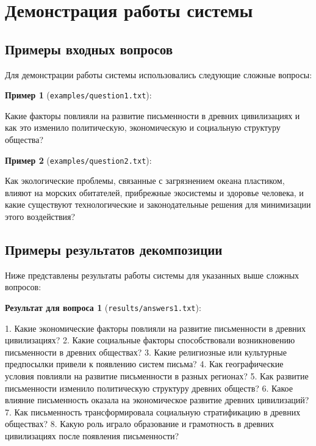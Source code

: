 \section{Демонстрация работы системы}

\subsection{Примеры входных вопросов}

Для демонстрации работы системы использовались следующие сложные вопросы:

\textbf{Пример 1} (\texttt{examples/question1.txt}):
\begin{spverbatim}
Какие факторы повлияли на развитие письменности в древних цивилизациях и как это изменило политическую, экономическую и социальную структуру общества?
\end{spverbatim}

\textbf{Пример 2} (\texttt{examples/question2.txt}):
\begin{spverbatim}
Как экологические проблемы, связанные с загрязнением океана пластиком, влияют на морских обитателей, прибрежные экосистемы и здоровье человека, и какие существуют технологические и законодательные решения для минимизации этого воздействия?
\end{spverbatim}

\subsection{Примеры результатов декомпозиции}

Ниже представлены результаты работы системы для указанных выше сложных вопросов:

\textbf{Результат для вопроса 1} (\texttt{results/answers1.txt}):
\begin{spverbatim}
1. Какие экономические факторы повлияли на развитие письменности в древних цивилизациях?
2. Какие социальные факторы способствовали возникновению письменности в древних обществах?
3. Какие религиозные или культурные предпосылки привели к появлению систем письма?
4. Как географические условия повлияли на развитие письменности в разных регионах?
5. Как развитие письменности изменило политическую структуру древних обществ?
6. Какое влияние письменность оказала на экономическое развитие древних цивилизаций?
7. Как письменность трансформировала социальную стратификацию в древних обществах?
8. Какую роль играло образование и грамотность в древних цивилизациях после появления письменности?
\end{spverbatim}

